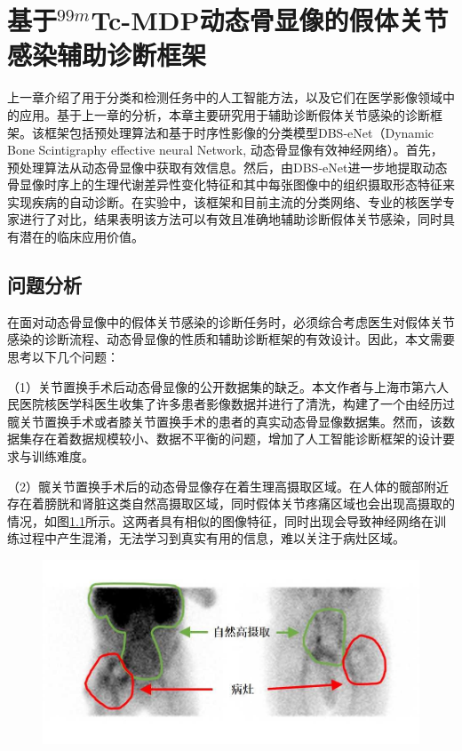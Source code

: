 \chapter{基于\texorpdfstring{\(^{99m}\)}{{\tm 99m}}{\tm Tc-MDP}动态骨显像的假体关节感染辅助诊断框架}

上一章介绍了用于分类和检测任务中的人工智能方法，以及它们在医学影像领域中的应用。基于上一章的分析，本章主要研究用于辅助诊断假体关节感染的诊断框架。该框架包括预处理算法和基于时序性影像的分类模型DBS-eNet（Dynamic Bone Scintigraphy effective neural Network, 动态骨显像有效神经网络）\cite{nie2023artificial}。首先，预处理算法从动态骨显像中获取有效信息。然后，由DBS-eNet进一步地提取动态骨显像时序上的生理代谢差异性变化特征和其中每张图像中的组织摄取形态特征来实现疾病的自动诊断。在实验中，该框架和目前主流的分类网络、专业的核医学专家进行了对比，结果表明该方法可以有效且准确地辅助诊断假体关节感染，同时具有潜在的临床应用价值。

\section{问题分析}

在面对动态骨显像中的假体关节感染的诊断任务时，必须综合考虑医生对假体关节感染的诊断流程、动态骨显像的性质和辅助诊断框架的有效设计。因此，本文需要思考以下几个问题：

（1）关节置换手术后动态骨显像的公开数据集的缺乏。本文作者与上海市第六人民医院核医学科医生收集了许多患者影像数据并进行了清洗，构建了一个由经历过髋关节置换手术或者膝关节置换手术的患者的真实动态骨显像数据集。然而，该数据集存在着数据规模较小、数据不平衡的问题，增加了人工智能诊断框架的设计要求与训练难度。

（2）髋关节置换手术后的动态骨显像存在着生理高摄取区域。在人体的髋部附近存在着膀胱和肾脏这类自然高摄取区域，同时假体关节疼痛区域也会出现高摄取的情况，如图\ref{fig:chap03_hip}所示。这两者具有相似的图像特征，同时出现会导致神经网络在训练过程中产生混淆，无法学习到真实有用的信息，难以关注于病灶区域。

\begin{figure}[ht]
  \centering
  \includegraphics{figures/chap03_hip.jpg}
  \label{fig:chap03_hip}
\end{figure}

